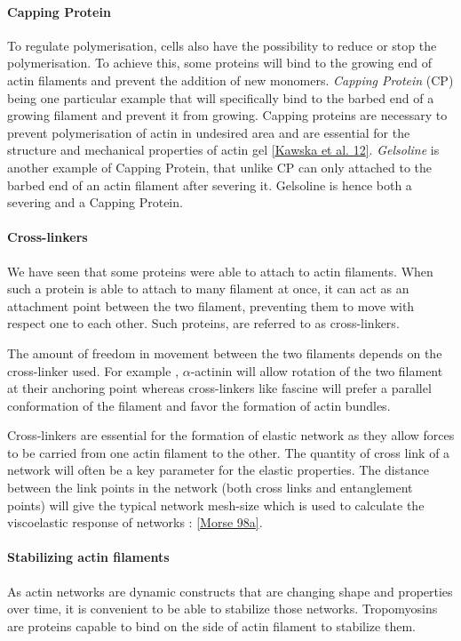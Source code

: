 \documentclass[A4paperpaper,11pt,english]{sphinxmanual}
\begin{document}
\paragraph{Capping Protein}
\label{parts/part1:capping-protein}
To regulate polymerisation, cells also have the possibility to reduce or stop
the polymerisation. To achieve this, some proteins will bind to the growing end
of actin filaments and prevent the addition of new monomers.  \emph{Capping Protein}
(CP) being one particular example that will specifically bind to the barbed end
of a growing filament and  prevent it from growing. Capping proteins are
necessary to prevent polymerisation of actin in undesired area
and are essential for the structure and mechanical properties of actin gel
{\hyperref[parts/part1:kawska2012]{{[}Kawska et al. 12{]}}}. \emph{Gelsoline} is another example of Capping Protein, that
unlike CP can only attached to the barbed end of an actin filament after
severing it. Gelsoline is hence both a severing and a Capping Protein.


\paragraph{Cross-linkers}
\label{parts/part1:cross-linkers}
We have seen that some proteins were able to attach to actin filaments. When
such a protein is able to attach to many filament at once, it can act as an
attachment point between the two filament, preventing them to move with respect
one to each other. Such proteins, are referred to as cross-linkers.

The amount of freedom in movement between the two filaments depends on the
cross-linker used. For example , \(\alpha\)-actinin will allow rotation of the two
filament at their anchoring point whereas cross-linkers like fascine will prefer
a parallel conformation of the filament and favor the formation of actin
bundles.

Cross-linkers are essential for the formation of elastic network as they allow
forces to be carried from one actin filament to the other. The quantity of
cross link of a network will often be a key parameter for the elastic properties.
The distance between the link points in the network (both cross links
and entanglement points) will give the typical network mesh-size which is used
to calculate the viscoelastic response of networks : {\hyperref[parts/part1:morse1998a]{{[}Morse 98a{]}}}.


\paragraph{Stabilizing actin filaments}
\label{parts/part1:stabilizing-actin-filaments}
As actin networks are dynamic constructs that are changing shape and properties
over time, it is convenient to be able to stabilize those networks. Tropomyosins
are proteins capable to bind on the side of actin filament to stabilize them.
\end{document}
